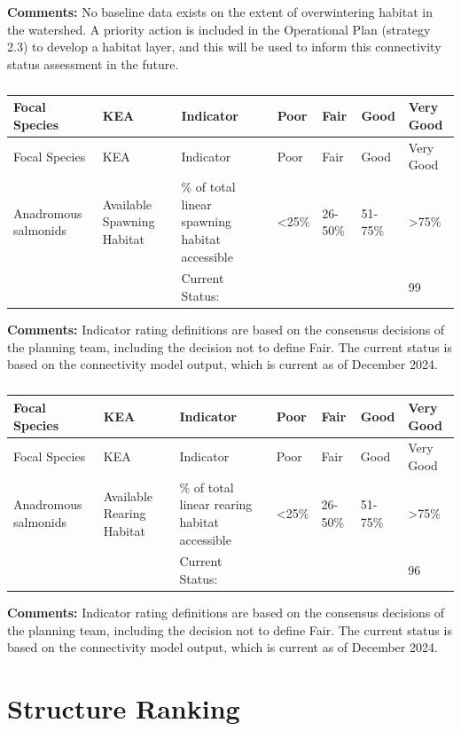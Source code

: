 \documentclass[
  letterpaper,
  DIV=11,
  numbers=noendperiod]{scrreprt}
\begin{document}
\textbf{Comments:} No baseline data exists on the extent of
overwintering habitat in the watershed. A priority action is included in
the Operational Plan (strategy 2.3) to develop a habitat layer, and this
will be used to inform this connectivity status assessment in the
future.

\begin{longtable}[]{@{}lllllll@{}}
\caption{}\label{T_806b5}\tabularnewline
\toprule\noalign{}
Focal Species & KEA & Indicator & Poor & Fair & Good & Very Good \\
\midrule\noalign{}
\endfirsthead
\toprule\noalign{}
Focal Species & KEA & Indicator & Poor & Fair & Good & Very Good \\
\midrule\noalign{}
\endhead
\bottomrule\noalign{}
\endlastfoot
Anadromous salmonids & Available Spawning Habitat & \% of total linear
spawning habitat accessible & \textless25\% & 26-50\% & 51-75\% &
\textgreater75\% \\
& & Current Status: & & & & 99 \\
\end{longtable}

\textbf{Comments:} Indicator rating definitions are based on the
consensus decisions of the planning team, including the decision not to
define Fair. The current status is based on the connectivity model
output, which is current as of December 2024.

\begin{longtable}[]{@{}lllllll@{}}
\caption{}\label{T_21126}\tabularnewline
\toprule\noalign{}
Focal Species & KEA & Indicator & Poor & Fair & Good & Very Good \\
\midrule\noalign{}
\endfirsthead
\toprule\noalign{}
Focal Species & KEA & Indicator & Poor & Fair & Good & Very Good \\
\midrule\noalign{}
\endhead
\bottomrule\noalign{}
\endlastfoot
Anadromous salmonids & Available Rearing Habitat & \% of total linear
rearing habitat accessible & \textless25\% & 26-50\% & 51-75\% &
\textgreater75\% \\
& & Current Status: & & & & 96 \\
\end{longtable}

\textbf{Comments:} Indicator rating definitions are based on the
consensus decisions of the planning team, including the decision not to
define Fair. The current status is based on the connectivity model
output, which is current as of December 2024.

\hypertarget{structure-ranking}{%
\section*{Structure Ranking}\label{structure-ranking}}
\end{document}
